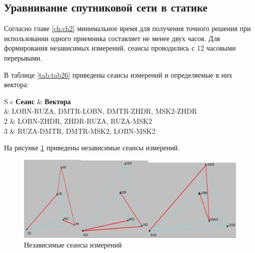 \subsection{Уравнивание спутниковой сети в статике}\label{subsec:ch3/sec1/sub2}

Согласно главе \cref{ch:ch2} минимальное время для получения точного решения при использовании одного приемника составляет не менее двух часов. Для формирования независимых измерений, сеансы проводились с 12 часовыми перерывами.

В таблице \cref{tab:tab26} приведены сеансы измерений и определяемые в них вектора:

\begin{table} [htbp]
	\centering\small
	\begin{threeparttable}%
		\label{tab:tab26}
		\setlength{\tabcolsep}{20pt}
		
		\begin{tabular}{ S c }
			\toprule
			\textbf{Сеанс}	& \textbf{Вектора}								\\ 				&  LOBN-RUZA, DMTR-LOBN, DMTR-ZHDR, MSK2-ZHDR	\\ %
			2				&  LOBN-ZHDR, ZHDR-RUZA, RUZA-MSK2				\\ %
			3				&  RUZA-DMTR, DMTR-MSK2, LOBN-MSK2 				\\ \bottomrule
		\end{tabular}	
	\end{threeparttable}
\end{table}

На рисунке \cref{fig:pic26} приведены независимые сеансы измерений.


\begin{figure}[!h]
	\centering
	\includegraphics[width=0.99\linewidth]{images/pic26}
	\caption{Независимые сеансы измерений }
	\label{fig:pic26}
\end{figure}

